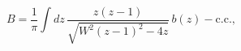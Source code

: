 \begin{equation}
B = \frac{1}{\pi} \int dz \,\frac{z(z-1)}{\sqrt{W^2(z-1)^2-4z}}\, b(z) - 
\text{c.c.},
\end{equation}

